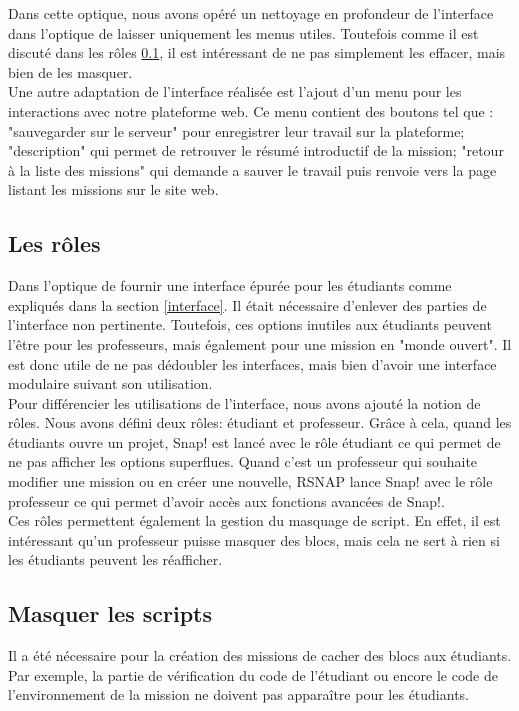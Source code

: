 Dans cette optique, nous avons opéré un nettoyage en profondeur de l'interface dans l'optique de laisser uniquement les menus utiles. Toutefois comme il est discuté dans les rôles \ref{role}, il est intéressant de ne pas simplement les effacer, mais bien de les masquer.\\

Une autre adaptation de l'interface réalisée est l'ajout d'un menu pour les interactions avec notre plateforme web. Ce menu contient des boutons tel que : "sauvegarder sur le serveur" pour enregistrer leur travail sur la plateforme; "description" qui permet de retrouver le résumé introductif de la mission; "retour à la liste des missions" qui demande a sauver le travail puis renvoie vers la page listant les missions sur le site web.

\subsection{Les rôles}
\label{role}
Dans l'optique de fournir une interface épurée pour les étudiants comme expliqués dans la section \ref{interface}. Il était nécessaire d'enlever des parties de l'interface non pertinente. Toutefois, ces options inutiles aux étudiants peuvent l'être pour les professeurs, mais également pour une mission en "monde ouvert". Il est donc utile de ne pas dédoubler les interfaces, mais bien d'avoir une interface modulaire suivant son utilisation. \\

Pour différencier les utilisations de l'interface, nous avons ajouté la notion de rôles. Nous avons défini deux rôles: étudiant et professeur. Grâce à cela, quand les étudiants ouvre un projet, Snap! est lancé avec le rôle étudiant ce qui permet de ne pas afficher les options superflues. Quand c'est un professeur qui souhaite modifier une mission ou en créer une nouvelle, RSNAP lance Snap! avec le rôle professeur ce qui permet d'avoir accès aux fonctions avancées de Snap!.\\

Ces rôles permettent également la gestion du masquage de script. En effet, il est intéressant qu'un professeur puisse masquer des blocs, mais cela ne sert à rien si les étudiants peuvent les réafficher.

\subsection{Masquer les scripts}
Il a été nécessaire pour la création des missions de cacher des blocs aux étudiants. Par exemple, la partie de vérification du code de l'étudiant ou encore le code de l'environnement de la mission ne doivent pas apparaître pour les étudiants. 

